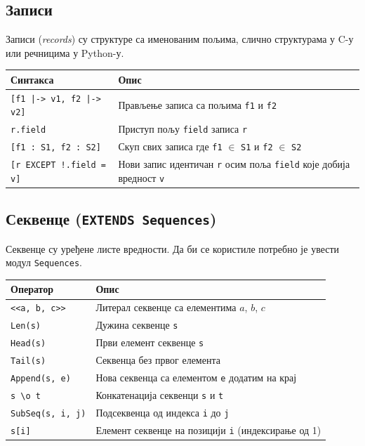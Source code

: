 \subsection{Записи}
Записи (\textit{records}) су структуре са именованим пољима, слично структурама у C-у или речницима у Python-у.
\begin{center}
\begin{tabularx}{\textwidth}{|l|X|}
\hline
\textbf{Синтакса} & \textbf{Опис} \\
\hline
\texttt{[f1 |-> v1, f2 |-> v2]} & Прављење записа са пољима \texttt{f1} и \texttt{f2} \\
\texttt{r.field}                & Приступ пољу \texttt{field} записа \texttt{r} \\
\texttt{[f1 : S1, f2 : S2]}     & Скуп свих записа где \texttt{f1} $\in$ \texttt{S1} и \texttt{f2} $\in$ \texttt{S2} \\
\texttt{[r EXCEPT !.field = v]} & Нови запис идентичан \texttt{r} осим поља \texttt{field} које добија вредност \texttt{v} \\
\hline
\end{tabularx}
\end{center}

\subsection{Секвенце (\texttt{EXTENDS Sequences})}
Секвенце су уређене листе вредности. Да би се користиле потребно је увести модул \texttt{Sequences}.
\begin{center}
\begin{tabularx}{\textwidth}{|l|X|}
\hline
\textbf{Оператор} & \textbf{Опис} \\
\hline
\texttt{<<a, b, c>>}      & Литерал секвенце са елементима $a$, $b$, $c$ \\
\texttt{Len(s)}           & Дужина секвенце \texttt{s} \\
\texttt{Head(s)}          & Први елемент секвенце \texttt{s} \\
\texttt{Tail(s)}          & Секвенца без првог елемента \\
\texttt{Append(s, e)}     & Нова секвенца са елементом \texttt{e} додатим на крај \\
\texttt{s \textbackslash o t} & Конкатенација секвенци \texttt{s} и \texttt{t} \\
\texttt{SubSeq(s, i, j)}  & Подсеквенца од индекса \texttt{i} до \texttt{j} \\
\texttt{s[i]}             & Елемент секвенце на позицији \texttt{i} (индексирање од 1) \\
\hline
\end{tabularx}
\end{center}

